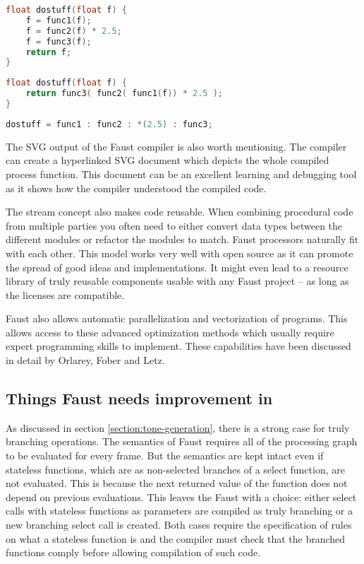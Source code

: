 \documentclass[11pt,a4paper]{article}
\begin{document}
\begin{lstlisting}[language=C,label=list:c-consec,caption=Consecutive calls]
float dostuff(float f) {
	f = func1(f);
	f = func2(f) * 2.5;
	f = func3(f);
	return f;
}
\end{lstlisting}

\begin{lstlisting}[language=C,label=list:c-enclosed,caption=Enclosed statements]
float dostuff(float f) {
	return func3( func2( func1(f)) * 2.5 );
}
\end{lstlisting}

\begin{lstlisting}[language=C,label=list:faust,caption=Faust sequential composition]
dostuff = func1 : func2 : *(2.5) : func3;
\end{lstlisting}

The SVG output of the Faust compiler is also worth mentioning. The compiler can create a hyperlinked SVG document which depicts the whole compiled process function. This document can be an excellent learning and debugging tool as it shows how the compiler understood the compiled code.

The stream concept also makes code reusable. When combining procedural code from multiple parties you often need to either convert data types between the different modules or refactor the modules to match. Faust processors naturally fit with each other. This model works very well with open source as it can promote the spread of good ideas and implementations. It might even lead to a resource library of truly reusable components usable with any Faust project -- as long as the licenses are compatible.

Faust also allows automatic parallelization and vectorization of programs. This allows access to these advanced optimization methods which usually require expert programming skills to implement. These capabilities have been discussed in detail by Orlarey, Fober and Letz\cite{orlarey:09a}.

\subsection{Things Faust needs improvement in}

As discussed in section \ref{section:tone-generation}, there is a strong case for truly branching operations. The semantics of Faust requires all of the processing graph to be evaluated for every frame. But the semantics are kept intact even if stateless functions, which are as non-selected branches of a select function, are not evaluated. This is because the next returned value of the function does not depend on previous evaluations. This leaves the Faust with a choice: either select calls with stateless functions as parameters are compiled as truly branching or a new branching select call is created. Both cases require the specification of rules on what a stateless function is and the compiler must check that the branched functions comply before allowing compilation of such code.
\end{document}
